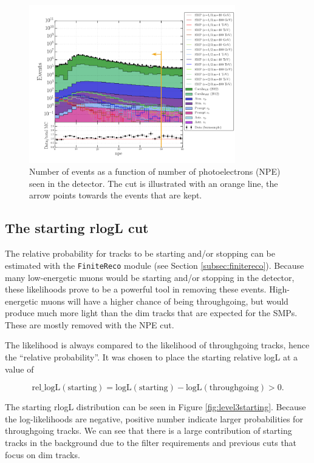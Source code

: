 \begin{figure}[t]
\centering
\includegraphics[width=0.8\textwidth]{chapter8/img/1D_stack_npe_final.png}
\caption{Number of events as a function of number of photoelectrons (NPE) seen in the detector. The cut is illustrated with an orange line, the arrow points towards the events that are kept.}
\label{fig:level3npe}
\end{figure}

\subsection{The starting rlogL cut}
The relative probability for tracks to be starting and/or stopping can be estimated with the \texttt{FiniteReco} module (see Section \ref{subsec:finitereco}). Because many low-energetic muons would be starting and/or stopping in the detector, these likelihoods prove to be a powerful tool in removing these events. High-energetic muons will have a higher chance of being throughgoing, but would produce much more light than the dim tracks that are expected for the SMPs. These are mostly removed with the NPE cut.

The likelihood is always compared to the likelihood of throughgoing tracks, hence the ``relative probability''. It was chosen to place the starting relative logL at a value of 

\begin{equation}
\textrm{rel\_logL}(\textrm{starting}) = \textrm{logL}(\textrm{starting}) - \textrm{logL}(\textrm{throughgoing}) > 0. 
\end{equation}

\noindent The starting rlogL distribution can be seen in Figure \ref{fig:level3starting}. Because the log-likelihoods are negative, positive number indicate larger probabilities for throughgoing tracks. We can see that there is a large contribution of starting tracks in the background due to the filter requirements and previous cuts that focus on dim tracks.


